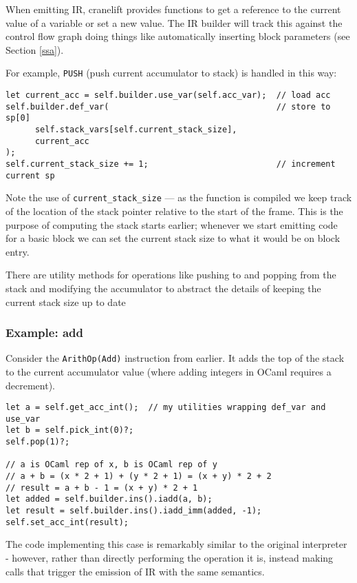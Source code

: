 When emitting IR, cranelift provides functions to get a reference to the current value of a
variable
or set a new value.  The IR builder will track this against the control flow graph doing things
like automatically inserting block parameters (see Section \ref{ssa}).

For example, \texttt{PUSH} (push current accumulator to stack) is handled in this way:

\begin{verbatim}
let current_acc = self.builder.use_var(self.acc_var);  // load acc
self.builder.def_var(                                  // store to sp[0]
      self.stack_vars[self.current_stack_size],
      current_acc
);
self.current_stack_size += 1;                          // increment current sp
\end{verbatim}

Note the use of \texttt{current\_stack\_size} --- as the function is compiled we keep track of the
location of the stack pointer relative to the start of the frame. This is the purpose of computing
the stack starts earlier; whenever we start emitting code for a basic block we can set the current
stack size to what it would be on block entry.

There are utility methods for operations like pushing to and popping from the stack and modifying
the accumulator to abstract the details of keeping the current stack size up to date

\subsubsection{Example: add}

Consider the \texttt{ArithOp(Add)} instruction from earlier. It adds the top of the stack to the
current accumulator value (where adding integers in OCaml requires a decrement).

\begin{verbatim}
let a = self.get_acc_int();  // my utilities wrapping def_var and use_var
let b = self.pick_int(0)?;
self.pop(1)?;

// a is OCaml rep of x, b is OCaml rep of y
// a + b = (x * 2 + 1) + (y * 2 + 1) = (x + y) * 2 + 2
// result = a + b - 1 = (x + y) * 2 + 1
let added = self.builder.ins().iadd(a, b);
let result = self.builder.ins().iadd_imm(added, -1);
self.set_acc_int(result);
\end{verbatim}

The code implementing this case is remarkably similar to the original interpreter - however, rather
than directly performing the operation it is, instead making calls that trigger the emission of IR
with the same semantics.

